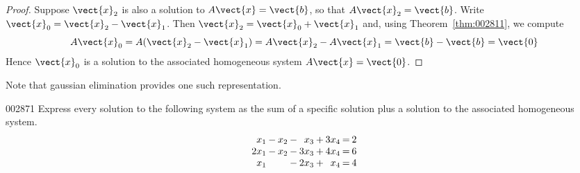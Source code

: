 \begin{proof}
Suppose $\vect{x}_{2}$ is also a solution to $A\vect{x} = \vect{b}$, so that $A\vect{x}_{2} = \vect{b}$. Write $\vect{x}_{0} = \vect{x}_{2} - \vect{x}_{1}$. Then $\vect{x}_{2} = \vect{x}_{0} + \vect{x}_{1}$ and, using Theorem~\ref{thm:002811}, we compute
\begin{equation*}
A\vect{x}_{0} = A(\vect{x}_{2} - \vect{x}_{1}) = A\vect{x}_{2} - A\vect{x}_{1} = \vect{b} - \vect{b} = \vect{0}
\end{equation*}
Hence $\vect{x}_{0}$ is a solution to the associated homogeneous system $A\vect{x} = \vect{0}$.
\end{proof}

\noindent Note that gaussian elimination provides one such representation.

\begin{example}{}{002871}
Express every solution to the following system as the sum of a specific solution plus a solution to the associated homogeneous system.
\begin{equation*}
\arraycolsep=1pt
\begin{array}{rrrrrrrrr}
x_{1} & - & x_{2} & - & x_{3} & + & 3x_{4} & = & 2 \\
2x_{1} & - & x_{2} & - & 3x_{3}&  + & 4x_{4} & = & 6 \\
x_{1} & & & - & 2x_{3} & + & x_{4} & = & 4
\end{array}
\end{equation*}



\end{example}
